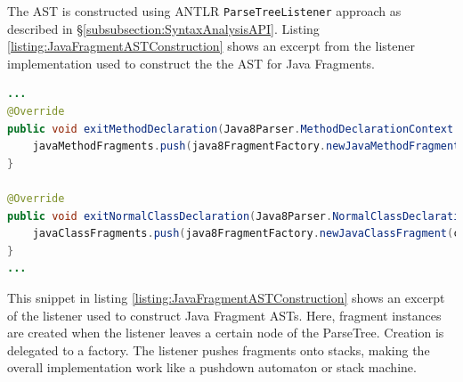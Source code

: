 The \gls{AST} is constructed using \gls{ANTLR} \texttt{ParseTreeListener} approach as described in §\ref{subsubsection:SyntaxAnalysisAPI}.
Listing \ref{listing:JavaFragmentASTConstruction} shows an excerpt from the listener implementation used to construct the the \gls{AST} for \gls{Java} \glspl{Fragment}.
\begin{lstlisting}[language=Java,caption={Construction of Java Fragment ASTs},label={listing:JavaFragmentASTConstruction}]
...
@Override
public void exitMethodDeclaration(Java8Parser.MethodDeclarationContext ctx) {
    javaMethodFragments.push(java8FragmentFactory.newJavaMethodFragment(ctx, javaMethodModifierFragments));
}

@Override
public void exitNormalClassDeclaration(Java8Parser.NormalClassDeclarationContext ctx) {
    javaClassFragments.push(java8FragmentFactory.newJavaClassFragment(ctx, javaClassModifierFragments, javaFieldFragments, javaMethodFragments, declaredPackage));
}
...
\end{lstlisting}
This snippet in listing \ref{listing:JavaFragmentASTConstruction} shows an excerpt of the listener used to construct \gls{Java} \gls{Fragment} \glspl{AST}.
Here, fragment instances are created when the listener leaves a certain node of the \gls{ParseTree}.
Creation is delegated to a factory.
The listener pushes fragments onto stacks, making the overall implementation work like a pushdown automaton or stack machine.



